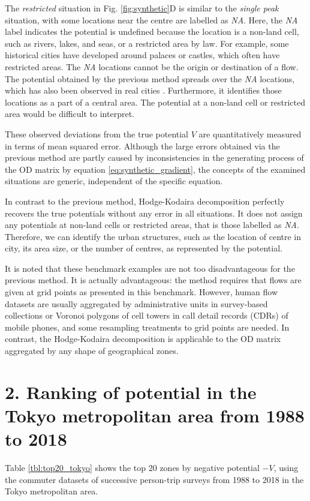 \documentclass[]{article}
\begin{document}
The \textit{restricted} situation in Fig. \ref{fig:synthetic}D is similar to the \textit{single peak} situation,  with some locations near the centre are labelled as \textit{NA}.
Here, the \textit{NA} label indicates the potential is undefined because the location is a non-land cell, such as rivers, lakes, and seas, or a restricted area by law.
For example, some historical cities have developed around palaces or castles, which often have restricted areas.
The \textit{NA} locations cannot be the origin or destination of a flow.
The potential obtained by the previous method spreads over the \textit{NA} locations, which has also been observed in real cities \cite{Mazzoli2019b}.
Furthermore, it identifies those locations as a part of a central area.
%
%
The potential at a non-land cell or restricted area would be difficult to interpret.

These observed deviations from the true potential $V$ are quantitatively measured in terms of mean squared error.
Although the large errors obtained via the previous method are partly caused by inconsistencies in the generating process of the OD matrix by equation \eqref{eq:synthetic_gradient},
the concepts of the examined situations are generic, independent of the specific equation.
%

In contrast to the previous method, Hodge-Kodaira decomposition perfectly recovers the true potentials without any error in all situations.
It does not assign any potentials at non-land cells or restricted areas, that is those labelled as  \textit{NA}.
Therefore, we can identify the urban structures, such as the location of centre in city, its area size, or the number of centres, as represented by the potential.

It is noted that these benchmark examples are not too disadvantageous for the previous method. It is actually advantageous: the method requires that flows are given at grid points as presented in this benchmark. However, human flow datasets are usually aggregated by administrative units in survey-based collections or Voronoi polygons of cell towers in call detail records (CDRs) of mobile phones, and some resampling treatments to grid points are needed.
In contrast, the Hodge-Kodaira decomposition is applicable to the OD matrix aggregated by any shape of geographical zones.



\section*{2. Ranking of potential in the Tokyo metropolitan area from 1988 to 2018}
Table \ref{tbl:top20_tokyo} shows the top 20 zones by  negative potential $-V$,
using the commuter datasets of successive person-trip surveys from 1988 to 2018 in the Tokyo metropolitan area.
\end{document}
